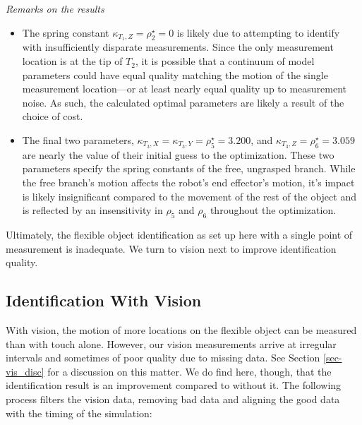 \documentclass[runningheads,a4paper]{llncs}
\begin{document}
\emph{Remarks on the results}
\begin{itemize}
\item The spring constant $\kappa_{T_1,Z} = \rho^\star_2 = 0$ is likely due to attempting to identify with insufficiently disparate measurements. Since the only measurement location is at the tip of $T_2$, it is possible that a continuum of model parameters could have equal quality matching the motion of the single measurement location---or at least nearly equal quality up to measurement noise. As such, the calculated optimal parameters are likely a result of the choice of cost.
\item The final two parameters, $\kappa_{T_3,X} = \kappa_{T_3,Y} = \rho^\star_5 = 3.200$, and $\kappa_{T_3,Z} = \rho^\star_6 = 3.059$ are nearly the value of their initial guess to the optimization. These two parameters specify the spring constants of the free, ungrasped branch. While the free branch's motion affects the robot's end effector's motion, it's impact is likely insignificant compared to the movement of the rest of the object and is reflected by an insensitivity in $\rho_5$ and $\rho_6$ throughout the optimization.
\end{itemize}
Ultimately, the flexible object identification as set up here with a single point of measurement is inadequate. We turn to vision next to improve identification quality.

\subsection{Identification With Vision \label{sec-w_vis}}
With vision, the motion of more locations on the flexible object can be measured than with touch alone. However, our vision measurements arrive at irregular intervals and sometimes of poor quality due to missing data. See Section \ref{sec-vis_disc} for a discussion on this matter. We do find here, though, that the identification result is an improvement compared to without it. The following process filters the vision data, removing bad data and aligning the good data with the timing of the simulation:
\end{document}
